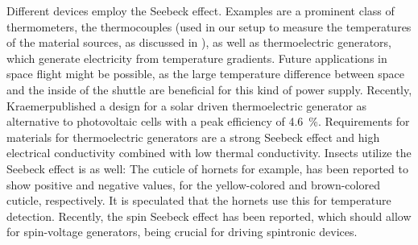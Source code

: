 Different devices employ the Seebeck effect. Examples are a prominent class of thermometers, the thermocouples (used in our setup to measure the temperatures of the material sources, as discussed in ), as well as thermoelectric generators, which generate electricity from temperature gradients.
Future applications in space flight might be possible, as the large temperature difference between space and the inside of the shuttle are beneficial for this kind of power supply. Recently, Kraemer\etal published\cite{Kraemer2011} a design for a solar driven thermoelectric generator as alternative to photovoltaic cells with a peak efficiency of \SI{4.6}{\percent}. %
Requirements for materials for thermoelectric generators are a strong Seebeck effect and high electrical conductivity combined with low thermal conductivity.
Insects utilize the Seebeck effect is as well: The cuticle of hornets for example, has been reported\cite{Shimony1981,Barron2009} to show positive and negative values, for the yellow-colored and brown-colored cuticle, respectively. It is speculated that the hornets use this for temperature detection.
Recently, the spin Seebeck effect has been reported, which should allow for spin-voltage generators, being crucial for driving spintronic devices\cite{Uchida2008}.

